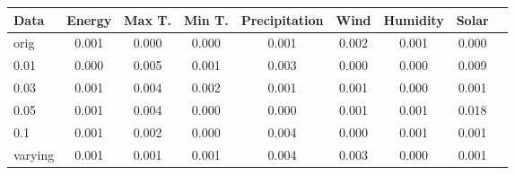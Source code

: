 \documentclass[12pt]{article}
\begin{document}
\begin{table}
\begin{tabular}{|p{2cm}|c|c|c|c|c|c|c|c|}
\hline
Data &Energy & Max T. & Min T. & Precipitation & Wind & Humidity & Solar\\ 
\hline
\multirow{1}{*}{orig} &   0.001 &    0.000 &    0.000 &    0.001 &    0.002 &    0.001 &    0.000\\ 
\cline{1-7}
\hline
\multirow{1}{*}{0.01} &   0.000 &    0.005 &    0.001 &    0.003 &    0.000 &    0.000 &    0.009\\ 
\cline{1-7}
\hline
\multirow{1}{*}{0.03} &   0.001 &    0.004 &    0.002 &    0.001 &    0.001 &    0.000 &    0.001\\ 
\cline{1-7}
\hline
\multirow{1}{*}{0.05} &   0.001 &    0.004 &    0.000 &    0.000 &    0.001 &    0.001 &    0.018\\ 
\cline{1-7}
\hline
\multirow{1}{*}{0.1} &   0.001 &    0.002 &    0.000 &    0.004 &    0.000 &    0.001 &    0.001\\ 
\cline{1-7}
\hline
\multirow{1}{*}{varying} &   0.001 &    0.001 &    0.001 &    0.004 &    0.003 &    0.000 &    0.001\\ 
\cline{1-7}
\hline
\end{tabular}
\end{table}
\end{document}
